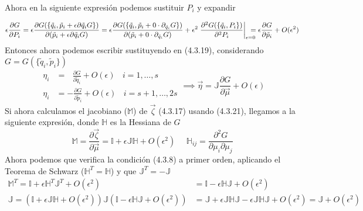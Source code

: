 \vspace{-30pt}
Ahora en la siguiente expresión podemos sustituir $P_i$ y expandir

\vspace{-15pt}
\begin{equation} \label{4.2.7}
        \epsilon \frac{\partial G}{\partial P_i} = \epsilon \frac{\partial G (\{\tilde{q}_i,\tilde{p}_i + \epsilon \partial{\tilde{q}_i} G\})}{\partial (\tilde{p}_i + \epsilon \partial{\tilde{q}_i} G)} = \epsilon \frac{\partial G (\{\tilde{q}_i,\tilde{p}_i + 0 \cdot  \partial_{\tilde{q}_i} G\})}{\partial (\tilde{p}_i + 0 \cdot \partial_{\tilde{q}_i} G)} +\epsilon^2 \left.\frac{\partial^2 G (\{\tilde{q}_i,P_i\})}{\partial^2 P_i }\right|_{\epsilon=0} \hspace{-10pt}= \epsilon \frac{\partial G}{\partial \tilde{p}_i} + O(\epsilon^2)
\end{equation} 
Entonces ahora podemos escribir sustituyendo en (4.3.19), considerando $G = G(\{\tilde{q}_i,\tilde{p}_i\})$
\begin{equation} \label{4.2.7}
    \begin{split}
        \eta_i &= \ \ \ \frac{\partial G}{\partial \tilde{q}_i} +O(\epsilon) \ \ \ \ i = 1,\dots,s\\ 
        \eta_i &= -\frac{\partial G}{\partial \tilde{p}_i} +O(\epsilon) \ \ \ \ i = s+1,\dots,2s
    \end{split} \implies \vec{\eta} = \mathbb{J} \frac{\partial G}{\partial \vec{\mu}} +O(\epsilon)
\end{equation} 
Si ahora calculamos el jacobiano ($\mathbb{M}$) de $\vec{\zeta}$ (4.3.17) usando (4.3.21), llegamos a la siguiente expresión, donde $\mathbb{H}$ es la Hessiana de $G$
\begin{equation} \label{4.2.7}
    \mathbb{M} = \frac{\partial \vec{\zeta}}{\partial \vec{\mu}} = \mathbb{I} + \epsilon \mathbb{J} \mathbb{H} + O(\epsilon^2) \ \ \ \ \ \ \mathbb{H}_{ij} = \frac{\partial^2 G}{\partial \mu_i \partial \mu_j}
\end{equation} 
Ahora podemos que verifica la condición (4.3.8) a primer orden, aplicando el Teorema de Schwarz ($\mathbb{H}^T = \mathbb{H}$) y que $\mathbb{J}^T = -\mathbb{J}$
\begin{equation} \label{4.2.7}
    \begin{split}
        \mathbb{M}^T = \mathbb{I} + \epsilon \mathbb{H}^T \mathbb{J}^T  + O(\epsilon^2) &= \mathbb{I} - \epsilon \mathbb{H} \mathbb{J}  + O(\epsilon^2)\\ 
        \mathbb{J} = \left(\mathbb{I} + \epsilon  \mathbb{J}\mathbb{H} + O(\epsilon^2)\right) \mathbb{J} \left(\mathbb{I} - \epsilon \mathbb{H} \mathbb{J}  + O(\epsilon^2)\right) &= \mathbb{J} + \epsilon  \mathbb{J}\mathbb{H}\mathbb{J} -  \epsilon  \mathbb{J}\mathbb{H}\mathbb{J} + O(\epsilon^2) = \mathbb{J} + O(\epsilon^2)
    \end{split}
\end{equation} 
